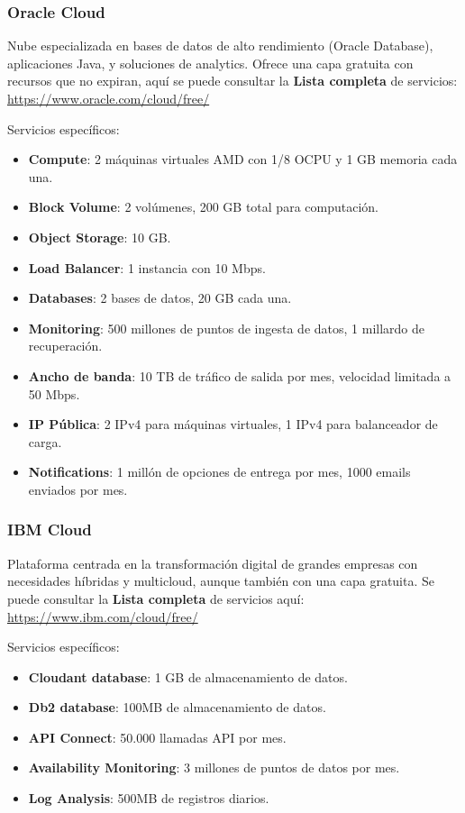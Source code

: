 \subsubsection*{Oracle Cloud}

Nube especializada en bases de datos de alto rendimiento (Oracle Database), aplicaciones Java, y soluciones de analytics. Ofrece una capa gratuita con recursos que no expiran, aquí se puede consultar la \textbf{Lista completa} de servicios: \url{https://www.oracle.com/cloud/free/}

Servicios específicos:
\begin{itemize}
	\item \textbf{Compute}: 2 máquinas virtuales AMD con 1/8 OCPU y 1 GB memoria cada una.
	\item \textbf{Block Volume}: 2 volúmenes, 200 GB total para computación.
	\item \textbf{Object Storage}: 10 GB.
	\item \textbf{Load Balancer}: 1 instancia con 10 Mbps.
	\item \textbf{Databases}: 2 bases de datos, 20 GB cada una.
	\item \textbf{Monitoring}: 500 millones de puntos de ingesta de datos, 1 millardo de recuperación.
	\item \textbf{Ancho de banda}: 10 TB de tráfico de salida por mes, velocidad limitada a 50 Mbps.
	\item \textbf{IP Pública}: 2 IPv4 para máquinas virtuales, 1 IPv4 para balanceador de carga.
	\item \textbf{Notifications}: 1 millón de opciones de entrega por mes, 1000 emails enviados por mes.
\end{itemize}

\subsubsection*{IBM Cloud}

Plataforma centrada en la transformación digital de grandes empresas con necesidades híbridas y multicloud, aunque también con una capa gratuita. Se puede consultar la \textbf{Lista completa} de servicios aquí: \url{https://www.ibm.com/cloud/free/}

Servicios específicos:
\begin{itemize}
	\item \textbf{Cloudant database}: 1 GB de almacenamiento de datos.
	\item \textbf{Db2 database}: 100MB de almacenamiento de datos.
	\item \textbf{API Connect}: 50.000 llamadas API por mes.
	\item \textbf{Availability Monitoring}: 3 millones de puntos de datos por mes.
	\item \textbf{Log Analysis}: 500MB de registros diarios.
\end{itemize}

